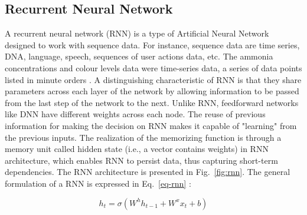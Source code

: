 
\subsection{Recurrent Neural Network}
A recurrent neural network (RNN) is a type of Artificial Neural Network designed to work with sequence data. For instance, sequence data are time series, DNA, language, speech, sequences of user actions data, etc. The ammonia concentrations and colour levels data were time-series data, a series of data points listed in minute orders \citep{dongesGuideRNNUnderstanding2021}. A distinguishing characteristic of RNN is that they share parameters across each layer of the network by allowing information to be passed from the last step of the network to the next. Unlike RNN, feedforward networks like DNN have different weights across each node. The reuse of previous information for making the decision on RNN makes it capable of "learning" from the previous inputs. The realization of the memorizing function is through a memory unit called hidden state (i.e., a vector contains weights) in RNN architecture, which enables RNN to persist data, thus capturing short-term dependencies. The RNN architecture is presented in Fig.~\ref{fig:rnn}. The general formulation of a RNN is expressed in Eq.~\ref{eq-rnn} \citep{mamandipoorMonitoringDetectingFaults2020}:

\begin{equation}\label{eq-rnn}
  h_t=\sigma(W^hh_{t-1}+W^xx_t+b)
\end{equation}

